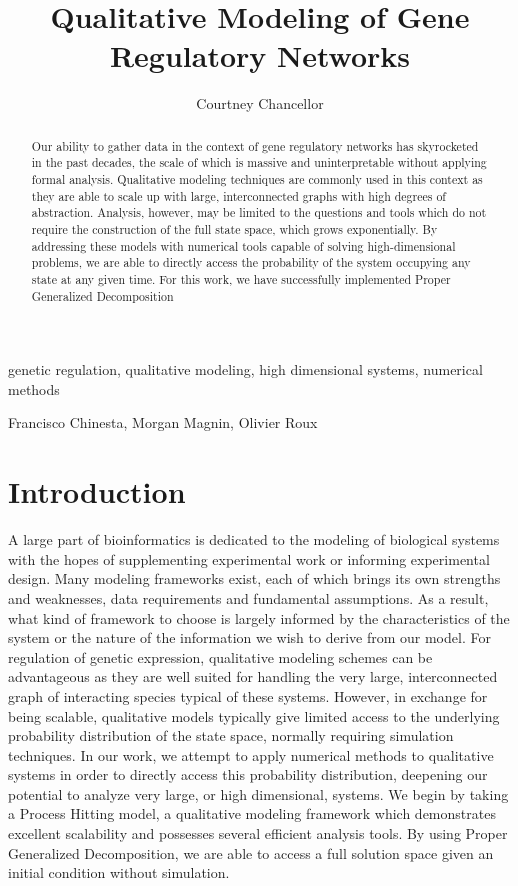 \documentclass[en]{jdoc}
\title{Qualitative Modeling of Gene Regulatory Networks}
\author{Courtney Chancellor}
\begin{document}
\makehead
 
 \begin{abstract}
 Our ability to gather data in the context of gene regulatory networks has skyrocketed in the past decades, 
the scale of which is massive and uninterpretable without applying formal analysis. Qualitative modeling techniques are commonly used in this context as they are able to scale up with large, interconnected graphs with high degrees of abstraction. Analysis, however, may be limited to the questions and tools which do not require the construction of the full state space, which grows exponentially. By addressing these models with numerical tools capable of solving high-dimensional problems, we are able to directly access the probability of the system occupying any state at any given time. For this work, we have successfully implemented Proper Generalized Decomposition
\end{abstract}

\begin{keywords}
 genetic regulation, 
 qualitative modeling, 
 high dimensional systems, 
 numerical methods
\end{keywords}

\begin{collaborations}
Francisco Chinesta,
Morgan Magnin,
Olivier Roux
\end{collaborations}

\section{Introduction}

  A large part of bioinformatics is dedicated to the modeling of biological systems with the hopes of supplementing experimental work or informing experimental design. Many modeling frameworks exist, each of which brings its own strengths and weaknesses, data requirements and fundamental assumptions. As a result, what kind of framework to choose is largely informed by the characteristics of the system or the nature of the information we wish to derive from our model. For regulation of genetic expression, qualitative modeling schemes can be advantageous as they are well suited for handling the very large, interconnected graph of interacting species typical of these systems. However, in exchange for being scalable, qualitative models typically give limited access to the underlying probability distribution of the state space, normally requiring simulation techniques. In our work, we attempt to apply numerical methods to qualitative systems in order to directly access this probability distribution, deepening our potential to analyze very large, or high dimensional, systems. We begin by taking a Process Hitting model, a qualitative modeling framework which demonstrates excellent scalability and possesses several efficient analysis tools. By using Proper Generalized Decomposition, we are able to access a full solution space given an initial condition without simulation.
  
\end{document}

